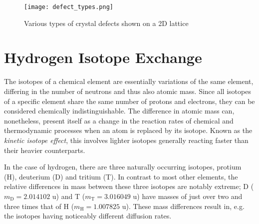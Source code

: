 \begin{figure}[!ht]
\center
\texttt{[image: defect\_types.png]}
\caption{Various types of crystal defects shown on a 2D lattice}
\label{Fig:defect_types}
\end{figure}


\section{Hydrogen Isotope Exchange}

The isotopes of a chemical element are essentially variations of the same element, differing in the number of neutrons and thus also atomic mass. 
Since all isotopes of a specific element share the same number of protons and electrons, they can be considered chemically indistinguishable. 
The difference in atomic mass can, nonetheless, present itself as a change in the reaction rates of chemical and thermodynamic processes when an atom is replaced by its isotope. 
Known as the \textit{kinetic isotope effect}, this involves lighter isotopes generally reacting faster than their heavier counterparts. \cite{atkins2006atkins}

In the case of hydrogen, there are three naturally occurring isotopes, protium (H), deuterium (D) and tritium (T). 
In contrast to most other elements, the relative differences in mass between these three isotopes are notably extreme; D ($m_{\text{D}}=2.014102$ u) and T ($m_{\text{T}}=3.016049$ u) have masses of just over two and three times that of H ($m_{\text{H}}=1.007825$ u). 
These mass differences result in, e.g. the isotopes having noticeably different diffusion rates.